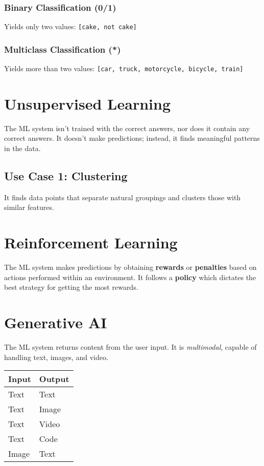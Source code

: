 \documentclass[a4paper,12pt]{article}
\begin{document}
\subsubsection*{Binary Classification (0/1)}
Yields only two values: \texttt{[cake, not cake]}

\subsubsection*{Multiclass Classification (*)}
Yields more than two values: \texttt{[car, truck, motorcycle, bicycle, train]}

\section*{Unsupervised Learning}
The ML system isn't trained with the correct answers, nor does it contain any correct answers. It doesn't make predictions; instead, it finds meaningful patterns in the data.

\subsection*{Use Case 1: Clustering}
It finds data points that separate natural groupings and clusters those with similar features.

\section*{Reinforcement Learning}
The ML system makes predictions by obtaining \textbf{rewards} or \textbf{penalties} based on actions performed within an environment. It follows a \textbf{policy} which dictates the best strategy for getting the most rewards.

\section*{Generative AI}
The ML system returns content from the user input. It is \textit{multimodal}, capable of handling text, images, and video.

\begin{center}
\begin{tabular}{@{}ll@{}}
\toprule
Input & Output \\
\midrule
Text & Text \\
Text & Image \\
Text & Video \\
Text & Code \\
Image & Text \\
\bottomrule
\end{tabular}
\end{center}
\end{document}
